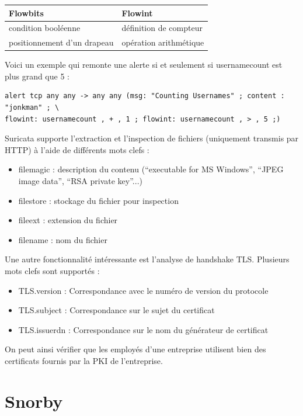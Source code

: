 \documentclass[a4paper,11pt,french]{article}
\begin{document}
\begin{center}
\begin{tabularx}{16cm}{|X|X|}
\hline
\textbf{Flowbits}&\textbf{Flowint}\\
\hline
condition booléenne  & définition de compteur\\
positionnement d’un drapeau & opération arithmétique\\
\hline
\end{tabularx}
\end{center}

Voici un exemple qui remonte une alerte si et seulement si usernamecount est plus grand que 5 :
\begin{Verbatim}
alert tcp any any -> any any (msg: "Counting Usernames" ; content : "jonkman" ; \
flowint: usernamecount , + , 1 ; flowint: usernamecount , > , 5 ;)
\end{Verbatim}

Suricata supporte l’extraction et l’inspection de fichiers (uniquement transmis par HTTP) à l’aide de différents mots clefs :
\begin{itemize}
\item filemagic : description du contenu (“executable for MS Windows”, “JPEG image data”, “RSA private key”...)
\item filestore : stockage du fichier pour inspection
\item fileext : extension du fichier
\item filename : nom du fichier
\end{itemize}

Une autre fonctionnalité intéressante est l’analyse de handshake TLS. Plusieurs mots clefs sont supportés :
\begin{itemize}
\item TLS.version : Correspondance avec le numéro de version du protocole
\item TLS.subject : Correspondance sur le sujet du certificat
\item TLS.issuerdn : Correspondance sur le nom du générateur de certificat
\end{itemize}

On peut ainsi vérifier que les employés d’une entreprise utilisent bien des certificats fournis par la PKI de l’entreprise. 

\newpage
\section{Snorby}
\end{document}
